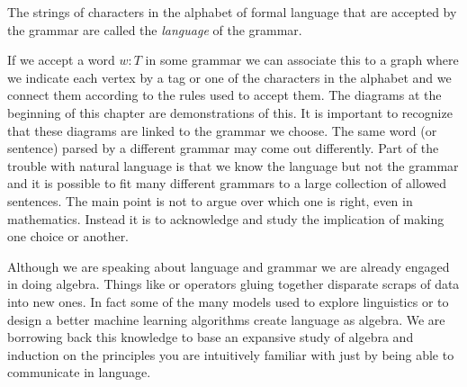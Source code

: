 \begin{definition}
    The strings of characters in the alphabet of formal language 
    that are accepted by the grammar are called the \emph{language}
    of the grammar.
\end{definition}

If we accept a word $w:T$ in some grammar we can associate this to a graph 
where we indicate each vertex by a tag or one of the characters in the alphabet
and we connect them according to the rules used to accept them.  The diagrams 
at the beginning of this chapter are demonstrations of this.  It is important 
to recognize that these diagrams are linked to the grammar we choose.  The same 
word (or sentence) parsed by a different grammar may come out differently.
Part of the trouble with natural language is that we know the language but not 
the grammar and it is possible to fit many different grammars to a large 
collection of allowed sentences.  The main point is not to argue over which 
one is right, even in mathematics.  Instead it is to acknowledge and study the 
implication of making one choice or another.

Although we are speaking about language and grammar we are already engaged in doing 
algebra.  
Things like  or operators gluing together disparate scraps of
data into new ones. In fact some of the many models used to explore linguistics
or to design a better machine learning algorithms create language as algebra. We
are borrowing back this knowledge to base an expansive study of algebra and
induction on the principles you are intuitively familiar with just by being able
to communicate in language.